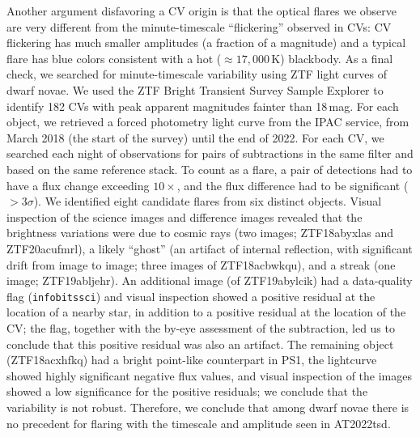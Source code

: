 \documentclass{nature_plusfigure}
\newcommand{\at}{AT2022tsd}
\begin{document}
\begin{methods}
Another argument disfavoring a CV origin is that the optical flares we observe are very different from the minute-timescale ``flickering'' observed in CVs: CV flickering has much smaller amplitudes (a fraction of a magnitude\cite{Bruch2021}) and a typical flare has blue colors consistent with a hot ($\approx17,000\,$K) blackbody\cite{Bruch2021}.
As a final check, we searched for minute-timescale variability using ZTF light curves of dwarf novae. 
We used the ZTF Bright Transient Survey\cite{FremlingBTS} Sample Explorer\cite{PerleyBTS} to identify 182 CVs with peak apparent magnitudes fainter than 18\,mag.
For each object, we retrieved a forced photometry light curve from the IPAC service\cite{Masci2019}, from March 2018 (the start of the survey) until the end of 2022. For each CV, we searched each night of observations for pairs of subtractions in the same filter and based on the same reference stack.
To count as a flare, a pair of detections had to have a flux change exceeding $10\times$, and the flux difference had to be significant ($>3\sigma$).
We identified eight candidate flares from six distinct objects. Visual inspection of the science images and difference images revealed that the brightness variations were due to cosmic rays (two images; ZTF18abyxlas and ZTF20acufmrl), a likely ``ghost'' (an artifact of internal reflection, with significant drift from image to image; three images of ZTF18acbwkqu), and a streak (one image; ZTF19abljehr). An additional image (of ZTF19abylcik) had a data-quality flag (\texttt{infobitssci}) and visual inspection showed a positive residual at the location of a nearby star, in addition to a positive residual at the location of the CV; the flag, together with the by-eye assessment of the subtraction, led us to conclude that this positive residual was also an artifact. The remaining object (ZTF18acxhfkq) had a bright point-like counterpart in PS1, the lightcurve showed highly significant negative flux values, and visual inspection of the images showed a low significance for the positive residuals; we conclude that the variability is not robust.  
Therefore, we conclude that among dwarf novae there is no precedent for flaring with the timescale and amplitude seen in \at.


\end{methods}
\end{document}
